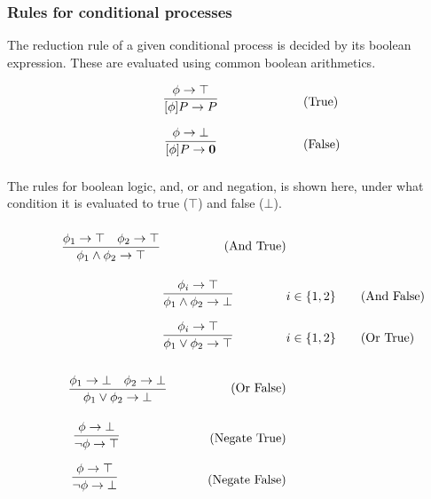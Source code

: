 \FloatBarrier

\subsubsection{Rules for conditional processes}
The reduction rule of a given conditional process is decided by its boolean expression. These are evaluated using common boolean arithmetics.

\begin{align}
	& \infrule{\phi \ra \top}{[\phi]P\ra P} \tag{True}\\
	& \infrule{\phi \ra \bot}{[\phi]P\ra \nil} \tag{False}
\end{align}

The rules for boolean logic, and, or and negation, is shown here, under what condition it is evaluated to true (\ensuremath{\top}) and false (\ensuremath{\bot}).
\begin{align*}
\infrule{\phi_1 \ra \top \quad \phi_2 \ra \top}{\phi_1 \wedge \phi_2 \ra \top}\tag{And True}\\
\infrule{\phi_i \ra \top}{\phi_1 \wedge \phi_2 \ra \bot} &i\in \{1,2\}\tag{And False}\\
\infrule{\phi_i \ra \top}{\phi_1 \vee \phi_2 \ra \top} &i\in \{1,2\} \tag{Or True}\\
\infrule{\phi_1 \ra \bot \quad \phi_2 \ra \bot}{\phi_1 \vee \phi_2 \ra \bot} \tag{Or False}\\
\infrule{\phi \ra \bot}{\neg\phi \ra \top} \tag{Negate True}\\
\infrule{\phi \ra \top}{\neg\phi \ra \bot} \tag{Negate False}\\
\end{align*}

